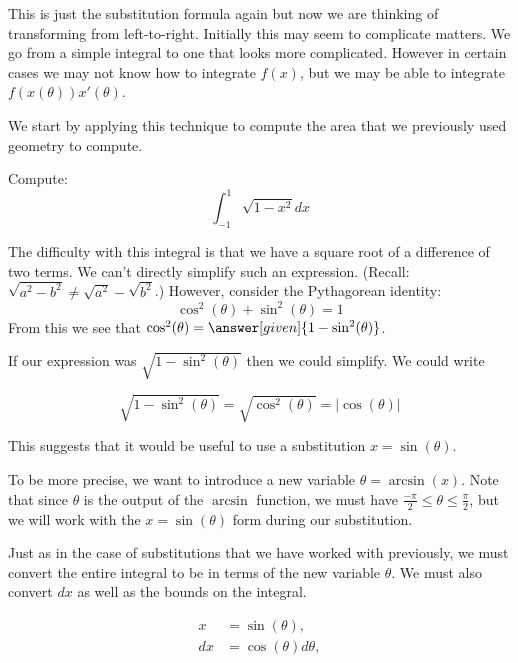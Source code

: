 \documentclass{ximera}
\begin{document}
This is just the substitution formula again but now we are thinking of transforming from left-to-right.  Initially this may seem to complicate matters. We go from a simple integral to one that looks more complicated. 
However in certain cases we may not know how to integrate $f(x)$, but we may be able to integrate 
$f(x(\theta)) x'(\theta)$. 


We start by applying this technique to compute the area that we previously used
geometry to compute.

\begin{example}
  Compute:
  \[
  \int_{-1}^1 \sqrt{1-x^2} dx
  \]
  \begin{explanation}

    The difficulty with this integral is that we have a square root of a difference of two terms.
    We can't directly simplify such an expression. (Recall:  $\sqrt{a^2-b^2} \neq \sqrt{a^2} - \sqrt{b^2}$.)  However, consider the Pythagorean identity:
    \[
    \cos^2(\theta) + \sin^2(\theta) = 1
    \]
    From this we see that $\cos^2(\theta)=
    \answer[given]{1-\sin^2(\theta)}$.


   If our expression was $\sqrt{1-\sin^{2}(\theta)}$ then we could simplify.
   We could write 

\[
\sqrt{1-\sin^{2}(\theta)}=\sqrt{\cos^{2}(\theta)}=|\cos(\theta)|
\]
%

This suggests that it would be useful to use a substitution $x=\sin(\theta)$. 

\begin{remark}
To be more precise, we want to introduce a new variable $\theta=\arcsin(x)$. 
Note that since $\theta$ is the output of the $\arcsin$ function, we must have $\frac{-\pi}{2} \leq \theta \leq \frac{\pi}{2} $, but we will work with the $x=\sin(\theta)$ form during our substitution.
\end{remark}

Just as in the case of substitutions that we have worked with previously, we must convert the entire integral to be in terms of the new variable $\theta$. 
We must also convert  $dx$ as well as the bounds on the integral.

    \begin{align*}
      x &=\sin(\theta),\\
      dx &= \cos(\theta) d\theta,
    \end{align*}


\end{explanation}
\end{example}
\end{document}
